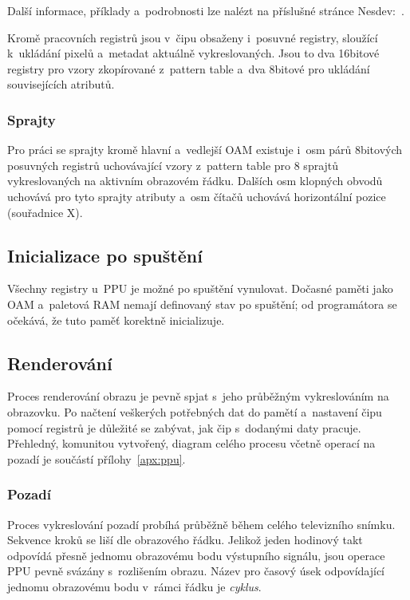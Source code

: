 Další informace, příklady a~podrobnosti lze nalézt na příslušné stránce Nesdev:~\cite{Nesdev:ppu-scroll}.

Kromě pracovních registrů jsou v~čipu obsaženy i~posuvné registry, sloužící k~ukládání pixelů a~metadat aktuálně vykreslovaných. Jsou to dva 16bitové registry pro vzory zkopírované z~pattern table a~dva 8bitové pro ukládání souvisejících atributů.

\subsubsection{Sprajty}
Pro práci se sprajty kromě hlavní a~vedlejší OAM existuje i~osm párů 8bitových posuvných registrů uchovávající vzory z~pattern table pro 8 sprajtů vykreslovaných na aktivním obrazovém řádku. Dalších osm klopných obvodů uchovává pro tyto sprajty atributy a~osm čítačů uchovává horizontální pozice (souřadnice X).


\subsection{Inicializace po spuštění}
Všechny registry u~PPU je možné po spuštění vynulovat. Dočasné paměti jako OAM a~paletová RAM nemají definovaný stav po spuštění; od programátora se očekává, že tuto paměť korektně inicializuje.

\subsection{Renderování}
Proces renderování obrazu je pevně spjat s~jeho průběžným vykreslováním na obrazovku. Po načtení veškerých potřebných dat do pamětí a~nastavení čipu pomocí registrů je důležité se zabývat, jak čip s~dodanými daty pracuje. Přehledný, komunitou vytvořený, diagram celého procesu včetně operací na pozadí je součástí přílohy~\ref{apx:ppu}.

\subsubsection{Pozadí}
Proces vykreslování pozadí probíhá průběžně během celého televizního snímku. Sekvence kroků se liší dle obrazového řádku. Jelikož jeden hodinový takt odpovídá přesně jednomu obrazovému bodu výstupního signálu, jsou operace PPU pevně svázány s~rozlišením obrazu. Název pro časový úsek odpovídající jednomu obrazovému bodu v~rámci řádku je \emph{cyklus}.

